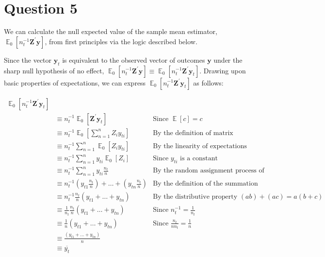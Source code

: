 \documentclass[11pt]{article}\usepackage[]{graphicx}\usepackage[]{color}
\theoremstyle{newstyle}
\DeclareMathOperator{\E}{\mathbb{E}}
\begin{document}
\section{Question 5} \label{qu: 5}

We can calculate the null expected value of the sample mean estimator, $\E_0\left[n_t^{-1} \mathbf{Z}^{\prime}\mathbf{y}\right]$, from first principles via the logic described below.

Since the vector $\mathbf{y}_t$ is equivalent to the observed vector of outcomes $\mathbf{y}$ under the sharp null hypothesis of no effect, $\E_0\left[n_t^{-1} \mathbf{Z}^{\prime}\mathbf{y}\right] \equiv \E_0\left[n_t^{-1} \mathbf{Z}^{\prime}\mathbf{y}_t\right]$. Drawing upon basic properties of expectations, we can express $\E_0\left[n_t^{-1} \mathbf{Z}^{\prime}\mathbf{y}_t\right]$ as follows:

\begin{align*}
\E_0\left[n_t^{-1} \mathbf{Z}^{\prime}\mathbf{y}_t\right] \\
& \equiv n_t^{-1} \E_0\left[\mathbf{Z}^{\prime}\mathbf{y}_t\right] & \text{Since } \E\left[c\right] = c \\
& \equiv n_t^{-1} \E_0\left[\sum \limits_{n = 1}^n Z_i y_{ti}\right] & \text{By the definition of matrix multiplication} \\
& \equiv n_t^{-1} \sum \limits_{n = 1}^n \E_0\left[Z_i y_{ti}\right] & \text{By the linearity of expectations} \\
& \equiv n_t^{-1} \sum \limits_{n = 1}^n y_{ti} \E_0\left[Z_i\right] & \text{Since } y_{ti} \text{ is a constant} \\
& \equiv n_t^{-1} \sum \limits_{n = 1}^n y_{ti} \frac{n_t}{n} & \text{By the random assignment process of the experiment} \\
& \equiv n_t^{-1}  \left(y_{t1} \frac{n_t}{n}\right) + \dots + \left(y_{tn} \frac{n_t}{n}\right) & \text{By the definition of the summation operator} \\
& \equiv n_t^{-1} \frac{n_t}{n} \left(y_{t1} + \dots + y_{tn}\right) & \text{By the distributive property } (a b) + (a  c) = a(b + c) \\
& \equiv \frac{1}{n_t} \frac{n_t}{n} \left(y_{t1} + \dots + y_{tn}\right) & \text{Since } n_t^{-1} = \frac{1}{n_t} \\
& \equiv \frac{1}{n} \left(y_{t1} + \dots + y_{tn}\right) & \text{Since } \frac{n_t}{n n_t} = \frac{1}{n} \\
& \equiv \frac{\left(y_{t1} + \dots + y_{tn}\right)}{n} \\
& \equiv \overline{y_t}
\end{align*}
\end{document}
